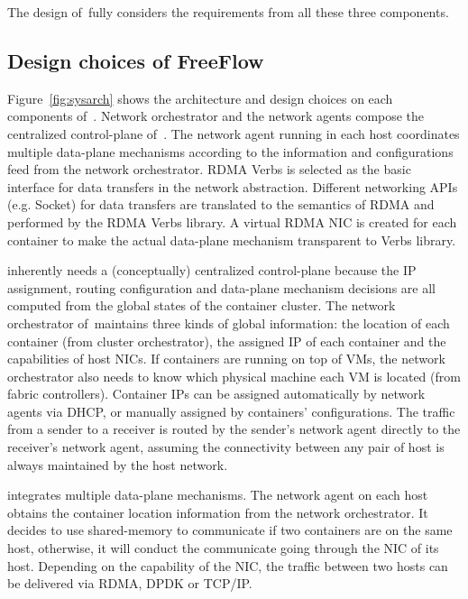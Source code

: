 The design of~\sysname fully considers the requirements from all these three
components.

\subsection{Design choices of FreeFlow}

Figure~\ref{fig:sysarch} shows the architecture and design choices on each 
components of~\sysname. Network orchestrator and the network agents compose 
the centralized control-plane of~\sysname. The network agent running in each 
host coordinates multiple data-plane mechanisms according to the information and 
configurations feed from the network orchestrator. RDMA Verbs is selected as 
the basic interface for data transfers in the network abstraction.  Different networking APIs (e.g. Socket) for data
transfers are translated to the semantics of RDMA and performed by the RDMA
Verbs library. A virtual RDMA NIC is created for each container to make the
actual data-plane mechanism transparent to Verbs library.

 \sysname inherently needs a (conceptually)
centralized control-plane because the IP assignment, routing configuration and 
data-plane mechanism decisions are all computed from the global states of the
container cluster. The network orchestrator of~\sysname maintains three kinds
of global information: the location of each container (from cluster orchestrator), the assigned IP of each
container and the capabilities of host NICs. If containers are running on top of
VMs, the network orchestrator also needs to know which physical machine each VM 
is located (from fabric controllers). Container IPs can be assigned 
automatically by network agents via DHCP, or manually assigned by containers' 
configurations. The traffic from a sender
to a receiver is routed by the sender's network agent directly to 
the receiver's network agent, assuming the connectivity between
any pair of host is always maintained by the host network. 

 \sysname integrates multiple data-plane 
mechanisms. The network agent on each host 
obtains the container location information from the network orchestrator. 
It decides to use shared-memory to communicate if two containers are on the
same host, otherwise, it will conduct the communicate going through 
the NIC of its host. Depending on the capability of the NIC, the traffic 
between two hosts can be delivered via RDMA, DPDK or TCP/IP.

